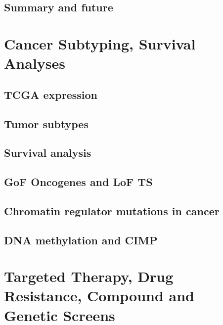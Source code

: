 \documentclass[
]{book}
\begin{document}
\hypertarget{summary-and-future}{%
\section{Summary and future}\label{summary-and-future}}

\hypertarget{cancersub}{%
\chapter{Cancer Subtyping, Survival Analyses}\label{cancersub}}

\hypertarget{tcga-expression}{%
\section{TCGA expression}\label{tcga-expression}}

\hypertarget{tumor-subtypes}{%
\section{Tumor subtypes}\label{tumor-subtypes}}

\hypertarget{survival-analysis}{%
\section{Survival analysis}\label{survival-analysis}}

\hypertarget{gof-oncogenes-and-lof-ts}{%
\section{GoF Oncogenes and LoF TS}\label{gof-oncogenes-and-lof-ts}}

\hypertarget{chromatin-regulator-mutations-in-cancer}{%
\section{Chromatin regulator mutations in cancer}\label{chromatin-regulator-mutations-in-cancer}}

\hypertarget{dna-methylation-and-cimp}{%
\section{DNA methylation and CIMP}\label{dna-methylation-and-cimp}}

\hypertarget{tt}{%
\chapter{Targeted Therapy, Drug Resistance, Compound and Genetic Screens}\label{tt}}
\end{document}
